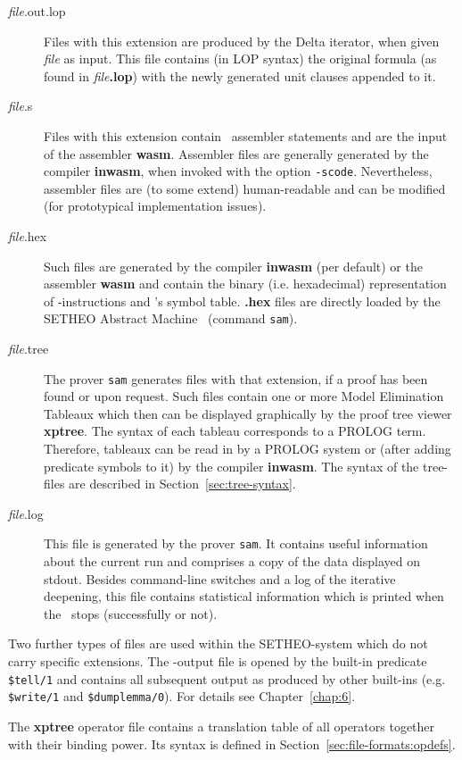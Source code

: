 \begin{description}
\item[{\em file}.out.lop]
Files with this extension are produced by the {\sc Delta} iterator,
when given {\em file\/} as input.
This file contains (in LOP syntax) the original formula (as found
in {\em file\/}{\bf .lop}) with the newly generated unit clauses
appended to it.

\item[{\em file}.s]
Files with this extension contain \SAM\ assembler statements and
are the input of the assembler {\bf wasm}.
Assembler files are generally generated by the compiler {\bf inwasm},
when invoked with the option {\tt -scode}.
Nevertheless, assembler files are (to some extend) human-readable
and can be modified (for prototypical implementation issues).

\item[{\em file}.hex]
Such files are generated by the compiler {\bf inwasm} (per default)
or the assembler {\bf wasm} and contain the
binary (i.e. hexadecimal) representation of \SAM-instructions and
\SAM's symbol table. {\bf .hex} files are directly loaded by the
SETHEO Abstract Machine \SAM\ (command {\tt sam}).

\item[{\em file}.tree]
The prover {\tt sam} generates files with that extension,
if a proof has been found or upon request. Such files contain
one or more Model Elimination Tableaux which then can be displayed
graphically by the proof tree viewer {\bf xptree}.
The syntax of each tableau corresponds to a PROLOG term. Therefore,
tableaux can be read in by a PROLOG system or (after adding
predicate symbols to it) by the compiler {\bf inwasm}.
The syntax of the tree-files are described in Section~\ref{sec:tree-syntax}.

\item[{\em file}.log]
This file is generated by the prover {\tt sam}. It contains useful
information about the current run and comprises
a copy of the data displayed on stdout.
Besides command-line switches and a log of the iterative deepening, this
file contains statistical information which is printed when the
\SAM\ stops (successfully or not).
\end{description}


Two further types of files are used within the SETHEO-system which
do not carry specific extensions.
The \SAM-output file is opened by the built-in predicate {\tt \$tell/1}
and contains all subsequent output as produced by other built-ins
(e.g. {\tt \$write/1} and {\tt \$dumplemma/0}).
For details see Chapter~\ref{chap:6}.

The {\bf xptree} operator file contains  a translation table
of all operators together with their binding power. Its syntax is
defined in Section~\ref{sec:file-formats:opdefs}.

